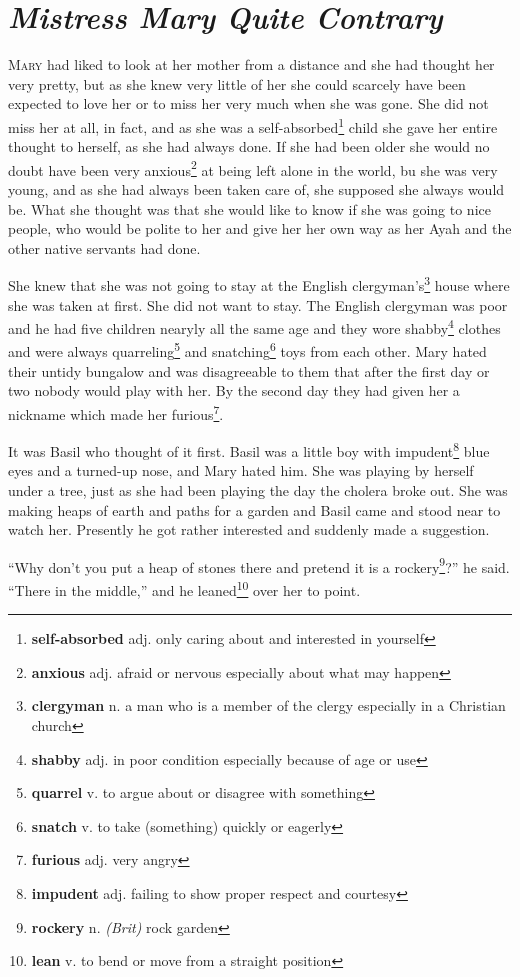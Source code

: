 \chapter{\textit{Mistress Mary Quite Contrary}}
\lettrine{M}{ary} had liked to look at her mother from a distance and she had thought her very pretty, but as she knew very little of her she could scarcely have been expected to love her or to miss her very much when she was gone. She did not miss her at all, in fact, and as she was a self-absorbed\footnote{\textbf{self-absorbed} adj. only caring about and interested in yourself} child she gave her entire thought to herself, as she had always done. If she had been older she would no doubt have been very anxious\footnote{\textbf{anxious} adj. afraid or nervous especially about what may happen} at being left alone in the world, bu she was very young, and as she had always been taken care of, she supposed she always would be. What she thought was that she would like to know if she was going to nice people, who would be polite to her and give her her own way as her Ayah and the other native servants had done.

She knew that she was not going to stay at the English clergyman's\footnote{\textbf{clergyman} n. a man who is a member of the clergy especially in a Christian church} house where she was taken at first. She did not want to stay. The English clergyman was poor and he had five children nearyly all the same age and they wore shabby\footnote{\textbf{shabby} adj. in poor condition especially because of age or use} clothes and were always quarreling\footnote{\textbf{quarrel} v. to argue about or disagree with something} and snatching\footnote{\textbf{snatch} v. to take (something) quickly or eagerly} toys from each other. Mary hated their untidy bungalow and was disagreeable to them that after the first day or two nobody would play with her. By the second day they had given her a nickname which made her furious\footnote{\textbf{furious} adj. very angry}.

It was Basil who thought of it first. Basil was a little boy with impudent\footnote{\textbf{impudent} adj. failing to show proper respect and courtesy} blue eyes and a turned-up nose, and Mary hated him. She was playing by herself under a tree, just as she had been playing the day the cholera broke out. She was making heaps of earth and paths for a garden and Basil came and stood near to watch her. Presently he got rather interested and suddenly made a suggestion.

``Why don't you put a heap of stones there and pretend it is a rockery\footnote{\textbf{rockery} n. \textit{(Brit)} rock garden}?'' he said. ``There in the middle,'' and he leaned\footnote{\textbf{lean} v. to bend or move from a straight position} over her to point.


